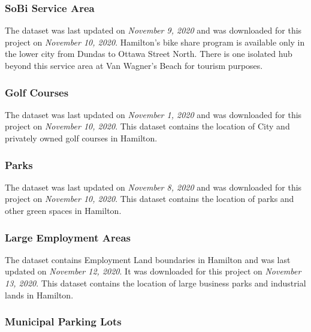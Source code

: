 \documentclass[
]{article}
\begin{document}
\hypertarget{sobi-service-area}{%
\subsubsection{SoBi Service Area}\label{sobi-service-area}}

The dataset was last updated on \emph{November 9, 2020} and was
downloaded for this project on \emph{November 10, 2020}. Hamilton's bike
share program is available only in the lower city from Dundas to Ottawa
Street North. There is one isolated hub beyond this service area at Van
Wagner's Beach for tourism purposes.

\hypertarget{golf-courses}{%
\subsubsection{Golf Courses}\label{golf-courses}}

The dataset was last updated on \emph{November 1, 2020} and was
downloaded for this project on \emph{November 10, 2020}. This dataset
contains the location of City and privately owned golf courses in
Hamilton.

\hypertarget{parks}{%
\subsubsection{Parks}\label{parks}}

The dataset was last updated on \emph{November 8, 2020} and was
downloaded for this project on \emph{November 10, 2020}. This dataset
contains the location of parks and other green spaces in Hamilton.

\hypertarget{large-employment-areas}{%
\subsubsection{Large Employment Areas}\label{large-employment-areas}}

The dataset contains Employment Land boundaries in Hamilton and was last
updated on \emph{November 12, 2020}. It was downloaded for this project
on \emph{November 13, 2020}. This dataset contains the location of large
business parks and industrial lands in Hamilton.

\hypertarget{municipal-parking-lots}{%
\subsubsection{Municipal Parking Lots}\label{municipal-parking-lots}}
\end{document}
